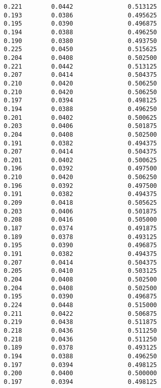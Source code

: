 \documentclass[
  letterpaper,
  DIV=11,
  numbers=noendperiod]{scrartcl}
\begin{document}
\begin{verbatim}
  0.221        0.0442               0.513125              
  0.193        0.0386               0.495625              
  0.195        0.0390               0.496875              
  0.194        0.0388               0.496250              
  0.190        0.0380               0.493750              
  0.225        0.0450               0.515625              
  0.204        0.0408               0.502500              
  0.221        0.0442               0.513125              
  0.207        0.0414               0.504375              
  0.210        0.0420               0.506250              
  0.210        0.0420               0.506250              
  0.197        0.0394               0.498125              
  0.194        0.0388               0.496250              
  0.201        0.0402               0.500625              
  0.203        0.0406               0.501875              
  0.204        0.0408               0.502500              
  0.191        0.0382               0.494375              
  0.207        0.0414               0.504375              
  0.201        0.0402               0.500625              
  0.196        0.0392               0.497500              
  0.210        0.0420               0.506250              
  0.196        0.0392               0.497500              
  0.191        0.0382               0.494375              
  0.209        0.0418               0.505625              
  0.203        0.0406               0.501875              
  0.208        0.0416               0.505000              
  0.187        0.0374               0.491875              
  0.189        0.0378               0.493125              
  0.195        0.0390               0.496875              
  0.191        0.0382               0.494375              
  0.207        0.0414               0.504375              
  0.205        0.0410               0.503125              
  0.204        0.0408               0.502500              
  0.204        0.0408               0.502500              
  0.195        0.0390               0.496875              
  0.224        0.0448               0.515000              
  0.211        0.0422               0.506875              
  0.219        0.0438               0.511875              
  0.218        0.0436               0.511250              
  0.218        0.0436               0.511250              
  0.189        0.0378               0.493125              
  0.194        0.0388               0.496250              
  0.197        0.0394               0.498125              
  0.200        0.0400               0.500000              
  0.197        0.0394               0.498125              

\end{verbatim}
\end{document}
